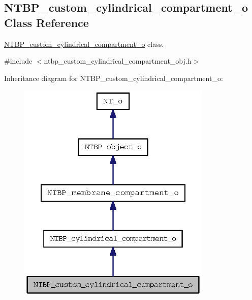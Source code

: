 \subsection{NTBP\_\-custom\_\-cylindrical\_\-compartment\_\-o Class Reference}
\label{class_n_t_b_p__custom__cylindrical__compartment__o}


\hyperlink{class_n_t_b_p__custom__cylindrical__compartment__o}{NTBP\_\-custom\_\-cylindrical\_\-compartment\_\-o} class.  




{\ttfamily \#include $<$ntbp\_\-custom\_\-cylindrical\_\-compartment\_\-obj.h$>$}



Inheritance diagram for NTBP\_\-custom\_\-cylindrical\_\-compartment\_\-o:
\nopagebreak
\begin{figure}[H]
\begin{center}
\leavevmode
\includegraphics[width=262pt]{class_n_t_b_p__custom__cylindrical__compartment__o__inherit__graph}
\end{center}
\end{figure}


